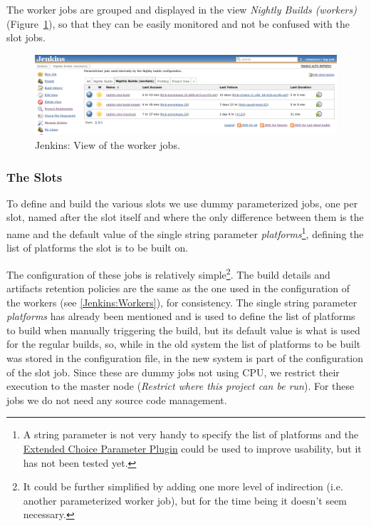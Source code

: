 \documentclass{lhcbnote}
\newcommand{\link}[2]{\href{#1}{#2}}
\begin{document}
The worker jobs are grouped and displayed in the view \emph{Nightly Builds
(workers)} (Figure~\ref{fig:jenkins-workers}), so that they can be easily
monitored and not be confused with the slot jobs.

\begin{figure}[t]
  \begin{center}
    \includegraphics[width=15cm]{images/jenkins-2}
  \end{center}
  \caption{Jenkins: View of the worker jobs.}
  \label{fig:jenkins-workers}
\end{figure}


\subsubsection{The Slots}
\label{Jenkins:Slots}
To define and build the various slots we use dummy parameterized jobs, one per
slot, named after the slot itself and where the only difference between them is
the name and the default value of the single string parameter
\emph{platforms}\footnote{A string parameter is not very handy to specify the
list of platforms and the
\link{
http://wiki.jenkins-ci.org/display/JENKINS/Extended+Choice+Parameter+plugin}{
Extended Choice Parameter Plugin} could be used to improve usability, but it has
not been tested yet.}, defining the list of platforms the slot is to be built
on.

The configuration of these jobs is relatively simple\footnote{It could be
further simplified by adding one more level of indirection (i.e. another
parameterized worker job), but for the time being it doesn't seem necessary.}.
The build details and artifacts retention policies are the same as the one used
in the configuration of the workers (see \ref{Jenkins:Workers}), for
consistency.  The single string parameter \emph{platforms} has already been
mentioned and is used to define the list of platforms to build when manually
triggering the build, but its default value is what is used for the regular
builds, so, while in the old system the list of platforms to be built was stored
in the configuration file, in the new system is part of the configuration of the
slot job.  Since these are dummy jobs not using CPU, we restrict their execution
to the master node (\emph{Restrict where this project can be run}).  For these
jobs we do not need any source code management.
\end{document}
